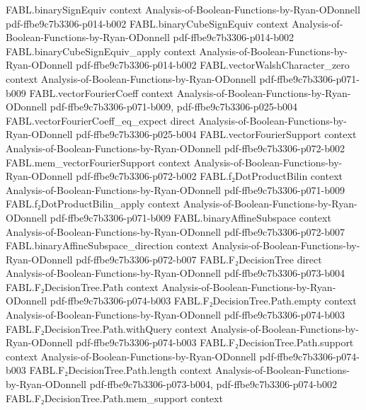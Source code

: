 \begin{theorem}
\proofstep
  {FABL.binarySignEquiv}
  {context}
  {Analysis-of-Boolean-Functions-by-Ryan-ODonnell}
  {pdf-ffbe9c7b3306-p014-b002}
\proofstep
  {FABL.binaryCubeSignEquiv}
  {context}
  {Analysis-of-Boolean-Functions-by-Ryan-ODonnell}
  {pdf-ffbe9c7b3306-p014-b002}
\proofstep
  {FABL.binaryCubeSignEquiv_apply}
  {context}
  {Analysis-of-Boolean-Functions-by-Ryan-ODonnell}
  {pdf-ffbe9c7b3306-p014-b002}
\proofstep
  {FABL.vectorWalshCharacter_zero}
  {context}
  {Analysis-of-Boolean-Functions-by-Ryan-ODonnell}
  {pdf-ffbe9c7b3306-p071-b009}
\proofstep
  {FABL.vectorFourierCoeff}
  {context}
  {Analysis-of-Boolean-Functions-by-Ryan-ODonnell}
  {pdf-ffbe9c7b3306-p071-b009,
    pdf-ffbe9c7b3306-p025-b004}
\proofstep
  {FABL.vectorFourierCoeff_eq_expect}
  {direct}
  {Analysis-of-Boolean-Functions-by-Ryan-ODonnell}
  {pdf-ffbe9c7b3306-p025-b004}
\proofstep
  {FABL.vectorFourierSupport}
  {context}
  {Analysis-of-Boolean-Functions-by-Ryan-ODonnell}
  {pdf-ffbe9c7b3306-p072-b002}
\proofstep
  {FABL.mem_vectorFourierSupport}
  {context}
  {Analysis-of-Boolean-Functions-by-Ryan-ODonnell}
  {pdf-ffbe9c7b3306-p072-b002}
\proofstep
  {FABL.f₂DotProductBilin}
  {context}
  {Analysis-of-Boolean-Functions-by-Ryan-ODonnell}
  {pdf-ffbe9c7b3306-p071-b009}
\proofstep
  {FABL.f₂DotProductBilin_apply}
  {context}
  {Analysis-of-Boolean-Functions-by-Ryan-ODonnell}
  {pdf-ffbe9c7b3306-p071-b009}
\proofstep
  {FABL.binaryAffineSubspace}
  {context}
  {Analysis-of-Boolean-Functions-by-Ryan-ODonnell}
  {pdf-ffbe9c7b3306-p072-b007}
\proofstep
  {FABL.binaryAffineSubspace_direction}
  {context}
  {Analysis-of-Boolean-Functions-by-Ryan-ODonnell}
  {pdf-ffbe9c7b3306-p072-b007}
\proofstep
  {FABL.F₂DecisionTree}
  {direct}
  {Analysis-of-Boolean-Functions-by-Ryan-ODonnell}
  {pdf-ffbe9c7b3306-p073-b004}
\proofstep
  {FABL.F₂DecisionTree.Path}
  {context}
  {Analysis-of-Boolean-Functions-by-Ryan-ODonnell}
  {pdf-ffbe9c7b3306-p074-b003}
\proofstep
  {FABL.F₂DecisionTree.Path.empty}
  {context}
  {Analysis-of-Boolean-Functions-by-Ryan-ODonnell}
  {pdf-ffbe9c7b3306-p074-b003}
\proofstep
  {FABL.F₂DecisionTree.Path.withQuery}
  {context}
  {Analysis-of-Boolean-Functions-by-Ryan-ODonnell}
  {pdf-ffbe9c7b3306-p074-b003}
\proofstep
  {FABL.F₂DecisionTree.Path.support}
  {context}
  {Analysis-of-Boolean-Functions-by-Ryan-ODonnell}
  {pdf-ffbe9c7b3306-p074-b003}
\proofstep
  {FABL.F₂DecisionTree.Path.length}
  {context}
  {Analysis-of-Boolean-Functions-by-Ryan-ODonnell}
  {pdf-ffbe9c7b3306-p073-b004,
    pdf-ffbe9c7b3306-p074-b002}
\proofstep
  {FABL.F₂DecisionTree.Path.mem_support}
  {context}

\end{theorem}
